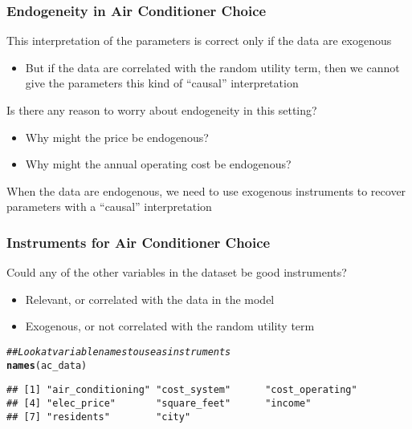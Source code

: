 \documentclass{beamer}\usepackage[]{graphicx}\usepackage[]{color}
\makeatletter
\newcommand{\hlcom}[1]{\textcolor[rgb]{0.678,0.584,0.686}{\textit{#1}}}%
\newcommand{\hlstd}[1]{\textcolor[rgb]{0.345,0.345,0.345}{#1}}%
\newcommand{\hlkwd}[1]{\textcolor[rgb]{0.737,0.353,0.396}{\textbf{#1}}}%
\newenvironment{kframe}{%
 \def\at@end@of@kframe{}%
 \ifinner\ifhmode%
  \def\at@end@of@kframe{\end{minipage}}%
  \begin{minipage}{\columnwidth}%
 \fi\fi%
 \def\FrameCommand##1{\hskip\@totalleftmargin \hskip-\fboxsep
 \colorbox{shadecolor}{##1}\hskip-\fboxsep
     \hskip-\linewidth \hskip-\@totalleftmargin \hskip\columnwidth}%
 \MakeFramed {\advance\hsize-\width
   \@totalleftmargin\z@ \linewidth\hsize
   \@setminipage}}%
 {\par\unskip\endMakeFramed%
 \at@end@of@kframe}
\newenvironment{knitrout}{}{} %
\makeatother
\begin{document}
\begin{frame}\frametitle{Endogeneity in Air Conditioner Choice}
    This interpretation of the parameters is correct only if the data are exogenous
    \begin{itemize}
    	\item But if the data are correlated with the random utility term, then we cannot give the parameters this kind of ``causal'' interpretation
    \end{itemize}
    \vspace{3ex}
    Is there any reason to worry about endogeneity in this setting?
    \begin{itemize}
    	\item Why might the price be endogenous?
    	\item Why might the annual operating cost be endogenous?
    \end{itemize}
    \vspace{3ex}
    When the data are endogenous, we need to use exogenous instruments to recover parameters with a ``causal'' interpretation
\end{frame}

\begin{frame}[fragile]\frametitle{Instruments for Air Conditioner Choice}
    Could any of the other variables in the dataset be good instruments?
    \begin{itemize}
    	\item Relevant, or correlated with the data in the model
    	\item Exogenous, or not correlated with the random utility term
    \end{itemize}
\begin{knitrout}\footnotesize
{}\color{fgcolor}\begin{kframe}
\begin{alltt}
\hlcom{## Look at variable names to use as instruments}
\hlkwd{names}\hlstd{(ac_data)}
\end{alltt}
\begin{verbatim}
## [1] "air_conditioning" "cost_system"      "cost_operating"  
## [4] "elec_price"       "square_feet"      "income"          
## [7] "residents"        "city"
\end{verbatim}
\end{kframe}
\end{knitrout}
\end{frame}
\end{document}
